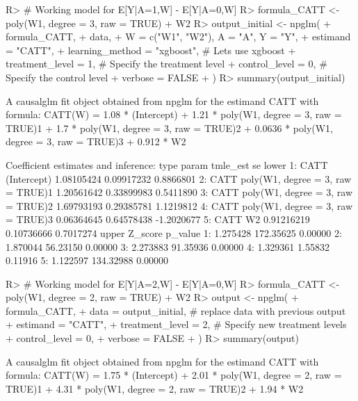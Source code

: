 \documentclass[
]{jss}
\begin{document}
\begin{CodeChunk}
\begin{CodeInput}
R> # Working model for E[Y|A=1,W] - E[Y|A=0,W]
R> formula_CATT <- ~ poly(W1, degree = 3, raw = TRUE) + W2
R> output_initial <- npglm(
+       formula_CATT, 
+       data,
+       W = c("W1", "W2"), A = "A", Y = "Y",
+       estimand = "CATT", 
+       learning_method = "xgboost", # Lets use xgboost
+       treatment_level = 1, # Specify the treatment level
+       control_level = 0, # Specify the control level
+       verbose = FALSE
+       )
R> summary(output_initial)
\end{CodeInput}
\begin{CodeOutput}
A causalglm fit object obtained from npglm for the estimand CATT with formula: 
CATT(W) = 1.08 * (Intercept) + 1.21 * poly(W1, degree = 3, raw = TRUE)1 + 1.7 * poly(W1, degree = 3, raw = TRUE)2 + 0.0636 * poly(W1, degree = 3, raw = TRUE)3 + 0.912 * W2

Coefficient estimates and inference:
   type                             param   tmle_est         se      lower
1: CATT                       (Intercept) 1.08105424 0.09917232  0.8866801
2: CATT poly(W1, degree = 3, raw = TRUE)1 1.20561642 0.33899983  0.5411890
3: CATT poly(W1, degree = 3, raw = TRUE)2 1.69793193 0.29385781  1.1219812
4: CATT poly(W1, degree = 3, raw = TRUE)3 0.06364645 0.64578438 -1.2020677
5: CATT                                W2 0.91216219 0.10736666  0.7017274
      upper   Z_score p_value
1: 1.275428 172.35625 0.00000
2: 1.870044  56.23150 0.00000
3: 2.273883  91.35936 0.00000
4: 1.329361   1.55832 0.11916
5: 1.122597 134.32988 0.00000
\end{CodeOutput}
\begin{CodeInput}
R> # Working model for E[Y|A=2,W] - E[Y|A=0,W]
R> formula_CATT <- ~ poly(W1, degree = 2, raw = TRUE) + W2
R> output <- npglm(
+       formula_CATT, 
+       data = output_initial, # replace data with previous output
+       estimand = "CATT", 
+       treatment_level = 2,  # Specify new treatment levels
+       control_level = 0,
+       verbose = FALSE
+       )
R> summary(output)
\end{CodeInput}
\begin{CodeOutput}
A causalglm fit object obtained from npglm for the estimand CATT with formula: 
CATT(W) = 1.75 * (Intercept) + 2.01 * poly(W1, degree = 2, raw = TRUE)1 + 4.31 * poly(W1, degree = 2, raw = TRUE)2 + 1.94 * W2


\end{CodeOutput}
\end{CodeChunk}
\end{document}

